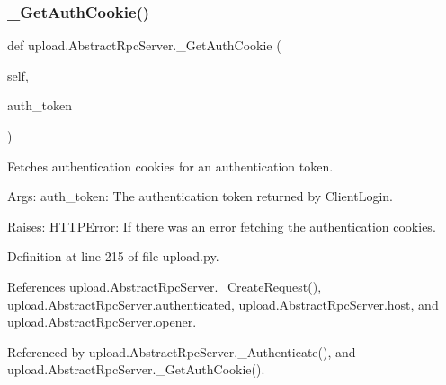 \subsubsection{\texorpdfstring{\+\_\+\+Get\+Auth\+Cookie()}{\_GetAuthCookie()}\hspace{0.1cm}{\footnotesize\ttfamily [2/2]}}
{\footnotesize\ttfamily def upload.\+Abstract\+Rpc\+Server.\+\_\+\+Get\+Auth\+Cookie (\begin{DoxyParamCaption}\item[{}]{self,  }\item[{}]{auth\+\_\+token }\end{DoxyParamCaption})\hspace{0.3cm}{\ttfamily [private]}}

\begin{DoxyVerb}Fetches authentication cookies for an authentication token.

Args:
  auth_token: The authentication token returned by ClientLogin.

Raises:
  HTTPError: If there was an error fetching the authentication cookies.
\end{DoxyVerb}
 

Definition at line 215 of file upload.\+py.



References upload.\+Abstract\+Rpc\+Server.\+\_\+\+Create\+Request(), upload.\+Abstract\+Rpc\+Server.\+authenticated, upload.\+Abstract\+Rpc\+Server.\+host, and upload.\+Abstract\+Rpc\+Server.\+opener.



Referenced by upload.\+Abstract\+Rpc\+Server.\+\_\+\+Authenticate(), and upload.\+Abstract\+Rpc\+Server.\+\_\+\+Get\+Auth\+Cookie().



